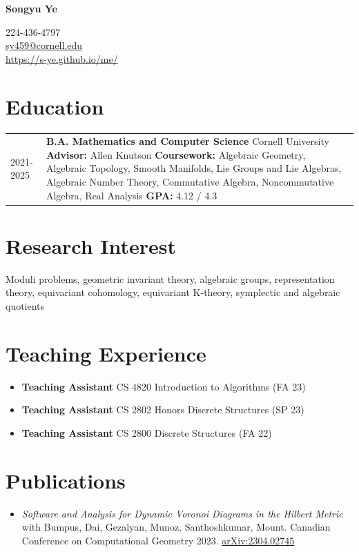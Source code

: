 \documentclass[12pt]{article}
\begin{document}
\begin{center}
     \Huge{\textbf{Songyu Ye}}
\end{center}
224-436-4797\\
\href{mailto:sy459@cornell.edu}{sy459@cornell.edu} \\ 
\url{https://s-ye.github.io/me/}

\section{Education}
\begin{tabular}{ l p{15in} }
    2021-2025 & \textbf{B.A. Mathematics and Computer Science}
    \newline Cornell University 
    \newline \textbf{Advisor:} Allen Knutson
    \newline \textbf{Coursework:} Algebraic Geometry, Algebraic Topology, Smooth Manifolds, 
    \newline Lie Groups and Lie Algebras, Algebraic Number Theory, Commutative Algebra,
    \newline  Noncommutative Algebra, Real Analysis 
    \newline \textbf{GPA:} 4.12 / 4.3 \\ 
\end{tabular}

\section{Research Interest}
Moduli problems, geometric invariant theory, algebraic groups, representation theory, equivariant cohomology, equivariant K-theory, symplectic and algebraic quotients

\section{Teaching Experience}
\begin{itemize}
    \itemsep=-.3em
    \small
    \item \textbf{Teaching Assistant} CS 4820 Introduction to Algorithms (FA 23) 
    \item \textbf{Teaching Assistant} CS 2802 Honors Discrete Structures (SP 23) 
    \item \textbf{Teaching Assistant} CS 2800 Discrete Structures (FA 22) 
\end{itemize}



\section{Publications}
\begin{itemize}
    \item \textit{Software and Analysis for Dynamic Voronoi Diagrams in the Hilbert Metric} with Bumpus, Dai, Gezalyan, Munoz, Santhoshkumar, Mount.  Canadian Conference on Computational Geometry 2023.
    \href{https://arxiv.org/pdf/2304.02745.pdf}{arXiv:2304.02745}
\end{itemize}
\end{document}
